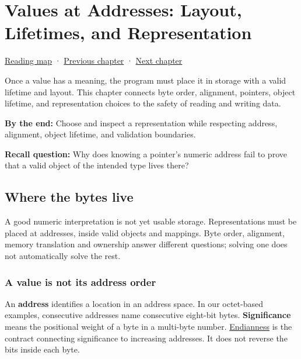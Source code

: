 \chapter{Values at Addresses: Layout, Lifetimes, and Representation}\label{01-foundations-i-ch002-values-at-addresses-layout-lifetimes-and-representation}\hypertarget{01-foundations-i-ch002}{}\label{stagechapter:01-foundations-i-ch002}

\hyperref[volume-reading-map]{Reading map} · \hyperref[01-foundations-i-ch001-from-bits-to-running-systems]{Previous chapter} · \hyperref[01-foundations-i-ch003-records-as-resource-transactions]{Next chapter}

Once a value has a meaning, the program must place it in storage with a valid lifetime and layout. This chapter connects byte order, alignment, pointers, object lifetime, and representation choices to the safety of reading and writing data.

\textbf{By the end:} Choose and inspect a representation while respecting address, alignment, object lifetime, and validation boundaries.

\textbf{Recall question:} Why does knowing a pointer's numeric address fail to prove that a valid object of the intended type lives there?

\section{Where the bytes live}\label{01-foundations-i-ch002-where-the-bytes-live}

A good numeric interpretation is not yet usable storage. Representations must be placed at addresses, inside valid objects and mappings. Byte order, alignment, memory translation and ownership answer different questions; solving one does not automatically solve the rest.

\subsection{A value is not its address order}\label{01-foundations-i-ch002-a-value-is-not-its-address-order}

An \textbf{address} identifies a location in an address space. In our octet-based examples, consecutive addresses name consecutive eight-bit bytes. \textbf{Significance} means the positional weight of a byte in a multi-byte number. \hyperref[appendix-bc07c3d25b18]{Endianness} is the contract connecting significance to increasing addresses. It does not reverse the bits inside each byte.

